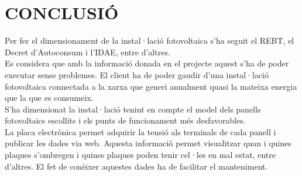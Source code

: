 \chapter{\uppercase{Conclusió}}

Per fer el dimensionament de la instal·lació fotovoltaica s'ha seguit el REBT, el Decret d'Autoconsum i l'IDAE, entre d'altres. \\
\newline Es considera que amb la informació donada en el projecte aquest s'ha de poder executar sense problemes. El client ha de poder gaudir d'una instal·lació fotovoltaica connectada a la xarxa que generi anualment quasi la mateixa energia que la que es consumeix.\\
\newline S'ha dimensionat la instal·lació tenint en compte el model dels panells fotovoltaics escollits i els punts de funcionament més desfavorables.\\
\newline La placa electrònica permet adquirir la tensió als terminals de cada panell i publicar les dades via web. Aquesta informació permet visualitzar quan i quines plaques s'ombregen i quines plaques poden tenir cel·les en mal estat, entre d'altres. El fet de conèixer aquestes dades ha de facilitar el manteniment.


\clearpage